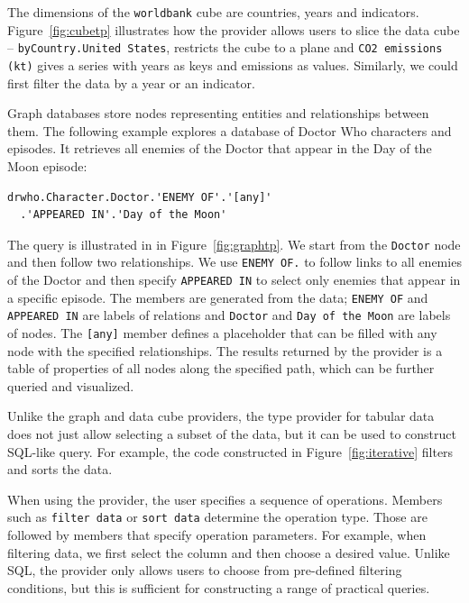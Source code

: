 \documentclass[fleqn,11pt]{report}
\theoremstyle{definition}
\begin{document}
\noindent
The dimensions of the \texttt{worldbank} cube are countries, years and indicators.
Figure~\ref{fig:cubetp} illustrates how the provider allows users to slice the data cube --
\texttt{byCountry.\textquotesingle United States\textquotesingle},
restricts the cube to a plane and \texttt{\textquotesingle CO2 emissions (kt)\textquotesingle}
gives a series with years as keys and emissions as values. Similarly, we could first filter the
data by a year or an indicator.

Graph databases store nodes representing entities and relationships between them.
The following example explores a database of Doctor Who characters and episodes. It retrieves
all enemies of the Doctor that appear in the Day of the Moon episode:

\begin{lstlisting}[language=thegamma]
drwho.Character.Doctor.'ENEMY OF'.'[any]'
  .'APPEARED IN'.'Day of the Moon'
\end{lstlisting}

\noindent
The query is illustrated in in Figure~\ref{fig:graphtp}. We start from the \texttt{Doctor} node
and then follow two relationships. We use \texttt{\textquotesingle ENEMY
OF\textquotesingle.\textquotesingle [any]\textquotesingle}
to follow links to all enemies of the Doctor and then specify
\texttt{\textquotesingle APPEARED IN\textquotesingle}
to select only enemies that appear in a specific episode. The members are generated from the data;
\texttt{\textquotesingle ENEMY OF\textquotesingle} and \texttt{\textquotesingle APPEARED IN\textquotesingle} are labels
of relations and \texttt{Doctor} and \texttt{\textquotesingle Day of the Moon\textquotesingle} are labels of nodes. The
\texttt{[any]} member defines a placeholder that can be filled with any node with the specified
relationships. The results returned by the provider is a table of properties of all nodes
along the specified path, which can be further queried and visualized.

Unlike the graph and data cube providers, the type provider for tabular data does not just
allow selecting a subset of the data, but it can be used to construct SQL-like query.
For example, the code constructed in Figure~\ref{fig:iterative} filters and sorts the data.

When using the provider, the user specifies a sequence of operations. Members such as
\texttt{\textquotesingle filter data\textquotesingle} or \texttt{\textquotesingle sort data\textquotesingle}
determine the operation type. Those are followed by members that specify operation parameters.
For example, when filtering data, we first select the column and then choose a desired value.
Unlike SQL, the provider only allows users to choose from pre-defined filtering conditions,
but this is sufficient for constructing a range of practical queries.
\end{document}
